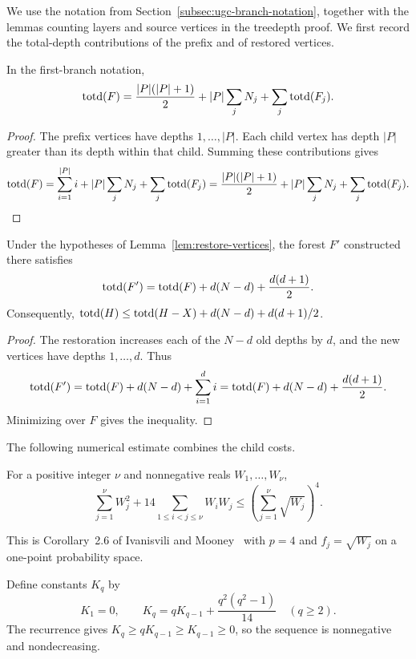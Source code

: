 We use the notation from Section~\ref{subsec:ugc-branch-notation},
together with the lemmas counting layers and source vertices in the
treedepth proof. We first record the total-depth contributions of
the prefix and of restored vertices.

\begin{lemma}
\label{lem:ugc-total-depth-accounting}
In the first-branch notation,
\[
 \operatorname{totd}(F)=\frac{|P|(|P|+1)}2+|P|\sum_jN_j+\sum_j\operatorname{totd}(F_j).
\]
\end{lemma}

\begin{proof}
The prefix vertices have depths $1,\ldots,|P|$. Each child vertex
has depth $|P|$ greater than its depth within that child. Summing
these contributions gives
\[
 \operatorname{totd}(F)=\sum_{i=1}^{|P|}i+|P|\sum_jN_j+\sum_j\operatorname{totd}(F_j)
 =\frac{|P|(|P|+1)}2+|P|\sum_jN_j+\sum_j\operatorname{totd}(F_j).
\]
\end{proof}

\begin{lemma}
\label{lem:restore-total-depth}
Under the hypotheses of Lemma~\ref{lem:restore-vertices}, the
forest $F'$ constructed there satisfies
\[
 \operatorname{totd}(F')=\operatorname{totd}(F)+d(N-d)+\frac{d(d+1)}2.
\]
Consequently,
$\operatorname{totd}(H)\leq\operatorname{totd}(H-X)+d(N-d)+d(d+1)/2$.
\end{lemma}

\begin{proof}
The restoration increases each of the $N-d$ old depths by $d$,
and the new vertices have depths $1,\ldots,d$. Thus
\[
 \operatorname{totd}(F')=\operatorname{totd}(F)+d(N-d)+\sum_{i=1}^d i
 =\operatorname{totd}(F)+d(N-d)+\frac{d(d+1)}2.
\]
Minimizing over $F$ gives the inequality.
\end{proof}

The following numerical estimate combines the child costs.

\begin{lemma}
\label{lem:quadratic-branching}
For a positive integer $\nu$ and nonnegative reals $W_1,\ldots,W_\nu$,
\[
 \sum_{j=1}^\nu W_j^2+14\sum_{1\leq i<j\leq \nu}W_iW_j
 \leq\left(\sum_{j=1}^\nu\sqrt{W_j}\right)^4.
\]
\end{lemma}

This is Corollary~2.6 of Ivanisvili and Mooney~\cite{IvanisviliMooney2020}
with $p=4$ and $f_j=\sqrt{W_j}$ on a one-point probability space.

Define constants $K_q$ by
\begin{equation}\label{eq:total-depth-K}
 K_1=0,\qquad
 K_q=qK_{q-1}+\frac{q^2(q^2-1)}{14}\quad(q\geq2).
\end{equation}
The recurrence gives $K_q\geq qK_{q-1}\geq K_{q-1}\geq0$, so the
sequence is nonnegative and nondecreasing.

